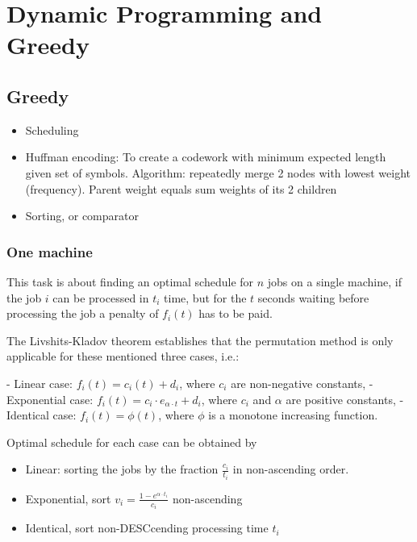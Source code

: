 
\chapter{Dynamic Programming and Greedy}

\section{Greedy}
    \begin{itemize}
        \item Scheduling
        \item Huffman encoding: To create a codework with minimum expected length given set of symbols. 
        Algorithm: repeatedly merge 2 nodes with lowest weight (frequency). Parent weight equals sum weights of its 2 children
        \item Sorting, or comparator
    \end{itemize}
    \subsection{One machine}
        This task is about finding an optimal schedule for $n$ jobs on a single machine, 
        if the job $i$ can be processed in $t_i$ time, 
        but for the $t$ seconds waiting before processing the job a penalty of $f_i(t)$ has to be paid.

        The Livshits-Kladov theorem establishes that the permutation method is only applicable for these mentioned three cases, i.e.:

        - Linear case: $f_i(t) = c_i(t) + d_i$, where $c_i$ are non-negative constants,
        - Exponential case: $f_i(t) = c_i \cdot e_{\alpha \cdot t} + d_i$, where $c_i$ and $\alpha$ are positive constants,
        - Identical case: $f_i(t) = \phi(t)$, where $\phi$ is a monotone increasing function.

        Optimal schedule for each case can be obtained by
        \begin{itemize}
            \item Linear: sorting the jobs by the fraction $\frac{c_i}{t_i}$ in non-ascending order.
            \item Exponential, sort $v_i = \frac{1 - e^{\alpha \cdot t_i}}{c_i}$ non-ascending
            \item Identical, sort non-DESCcending processing time $t_i$
        \end{itemize}

